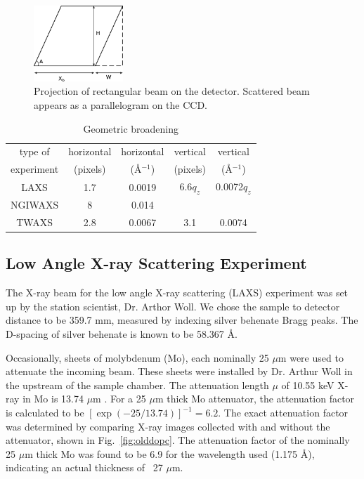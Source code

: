 \begin{figure}[htbp]
  \centering
  \includegraphics[width=0.3\textwidth]{figures/ripple/MMs/transmission/geometric_broadening4}
  \caption{Projection of rectangular beam on the detector. Scattered beam
  appears as a parallelogram on the CCD.}
  \label{fig:gb_trans3}
\end{figure}

\begin{table}[p]
  \centering
  \begin{tabular}{ccccc}
    \hline
    type of & horizontal & horizontal & vertical & vertical \\
    experiment & (pixels) & (\AA$^{-1}$) & (pixels) & (\AA$^{-1}$) \\
    \hline
    LAXS & 1.7 & 0.0019 & 6.6$q_z$ & 0.0072$q_z$ \\
    NGIWAXS & 8 & 0.014 &  & \\
    TWAXS & 2.8 & 0.0067 & 3.1 & 0.0074 \\
    \hline
  \end{tabular}
  \caption{Geometric broadening}
  \label{tb:geometric_broadening}
\end{table}

\newpage
\subsection{Low Angle X-ray Scattering Experiment}\label{sec:LAXS_method}
The X-ray beam for the low angle X-ray scattering (LAXS) experiment 
was set up by the station scientist, Dr. Arthor Woll.
We chose the sample to detector distance to be 359.7 mm, measured by indexing
silver behenate Bragg peaks. The D-spacing of silver behenate is known to be
58.367 \AA.

Occasionally, sheets of molybdenum (Mo), each nominally 25 $\mu$m were 
used to attenuate the incoming beam. 
These sheets were installed by Dr. Arthur Woll in the upstream of the sample chamber.
The attenuation length $\mu$ of 10.55 keV X-ray in Mo is 13.74 $\mu$m \cite{ref:cxro}.
For a 25 $\mu$m thick Mo attenuator, the attenuation factor is calculated to be
$[\exp(-25/13.74)]^{-1} = 6.2$. The exact attenuation factor was determined
by comparing X-ray images collected with and without the attenuator, 
shown in Fig.~\ref{fig:olddopc}.
The attenuation factor of the nominally 25 $\mu$m thick Mo was found to 
be 6.9 for the wavelength used (1.175 \AA), indicating an actual thickness
of ~27 $\mu$m. 

